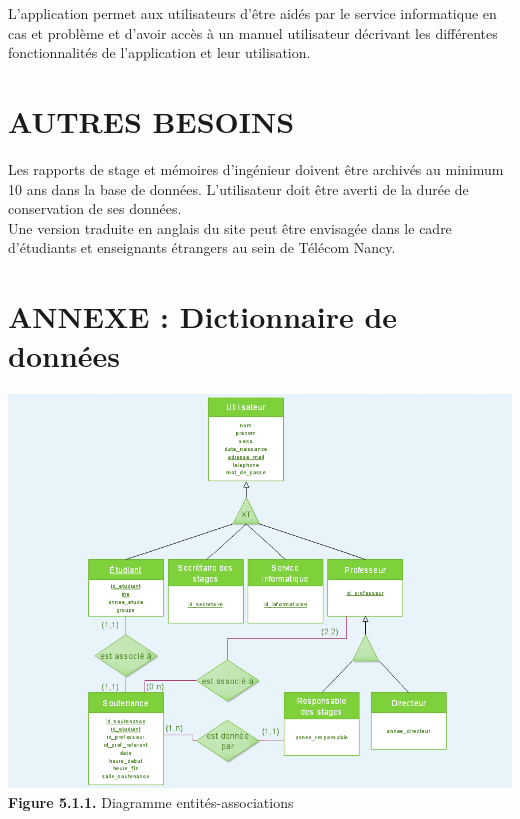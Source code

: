 \documentclass{scrreprt}
\begin{document}
\hspace{0.6cm}L'application permet aux utilisateurs d'être aidés par le service informatique en cas et problème et d'avoir accès à un manuel utilisateur décrivant les différentes fonctionnalités de l'application et leur utilisation.





\chapter{AUTRES BESOINS}

\hspace{1cm}Les rapports de stage et mémoires d'ingénieur doivent être archivés au minimum 10 ans dans la base de données. L'utilisateur doit être averti de la durée de conservation de ses données.\\

\hspace{0,6cm}Une version traduite en anglais du site peut être envisagée dans le cadre d'étudiants et enseignants étrangers au sein de Télécom Nancy.

\appendix
\chapter*{ANNEXE : Dictionnaire de données}

\vspace {1cm}
\begin{center}
	\includegraphics[scale=0.45]{image/diagentiassoc.png}
	\vspace {0.5cm}
	\textbf{Figure 5.1.1.} Diagramme entités-associations
\end{center}
\end{document}
